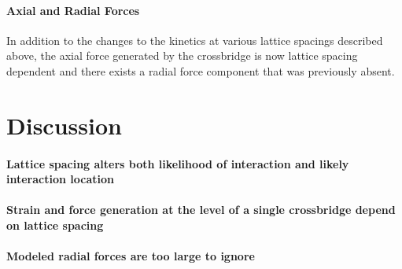 \documentclass[]{article}
\begin{document}
\paragraph{Axial and Radial Forces} %
In addition to the changes to the kinetics at various lattice spacings described above, the axial force generated by the crossbridge is now lattice spacing dependent and there exists a radial force component that was previously absent.



\section{Discussion} %


\paragraph{Lattice spacing alters both likelihood of interaction and likely interaction location} %


\paragraph{Strain and force generation at the level of a single crossbridge depend on lattice spacing} %

\paragraph{Modeled radial forces are too large to ignore} %
\end{document}
